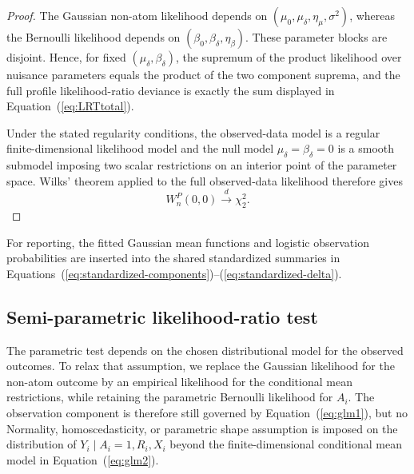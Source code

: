 \documentclass[11pt]{article}
\begin{document}
\begin{proof}
The Gaussian non-atom likelihood depends on $(\mu_0,\mu_\delta,\eta_\mu,\sigma^2)$, whereas the Bernoulli likelihood depends on $(\beta_0,\beta_\delta,\eta_\beta)$. These parameter blocks are disjoint. Hence, for fixed $(\mu_\delta,\beta_\delta)$, the supremum of the product likelihood over nuisance parameters equals the product of the two component suprema, and the full profile likelihood-ratio deviance is exactly the sum displayed in Equation~(\ref{eq:LRTtotal}).

Under the stated regularity conditions, the observed-data model is a regular finite-dimensional likelihood model and the null model $\mu_\delta=\beta_\delta=0$ is a smooth submodel imposing two scalar restrictions on an interior point of the parameter space. Wilks' theorem \citep{wilks1938large} applied to the full observed-data likelihood therefore gives
\[
  W_n^P(0,0)\overset{d}{\longrightarrow}\chi^2_2 .
\]
\end{proof}

For reporting, the fitted Gaussian mean functions and logistic observation probabilities are inserted into the shared standardized summaries in Equations~(\ref{eq:standardized-components})--(\ref{eq:standardized-delta}).

\subsection{Semi-parametric likelihood-ratio test}

The parametric test depends on the chosen distributional model for the observed outcomes. To relax that assumption, we replace the Gaussian likelihood for the non-atom outcome by an empirical likelihood for the conditional mean restrictions, while retaining the parametric Bernoulli likelihood for $A_i$. The observation component is therefore still governed by Equation~(\ref{eq:glm1}), but no Normality, homoscedasticity, or parametric shape assumption is imposed on the distribution of $Y_i \mid A_i = 1, R_i, X_i$ beyond the finite-dimensional conditional mean model in Equation~(\ref{eq:glm2}).
\end{document}
